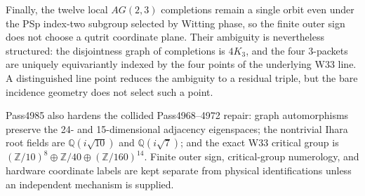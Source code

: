 Finally, the twelve local $AG(2,3)$ completions remain a single orbit even under the PSp index-two subgroup selected by Witting phase, so the finite outer sign does not choose a qutrit coordinate plane.  Their ambiguity is nevertheless structured: the disjointness graph of completions is $4K_3$, and the four 3-packets are uniquely equivariantly indexed by the four points of the underlying W33 line.  A distinguished line point reduces the ambiguity to a residual triple, but the bare incidence geometry does not select such a point.

Pass4985 also hardens the collided Pass4968--4972 repair: graph automorphisms preserve the 24- and 15-dimensional adjacency eigenspaces; the nontrivial Ihara root fields are $\mathbb Q(i\sqrt{10})$ and $\mathbb Q(i\sqrt7)$; and the exact W33 critical group is $(\mathbb Z/10)^8\oplus\mathbb Z/40\oplus(\mathbb Z/160)^{14}$.  Finite outer sign, critical-group numerology, and hardware coordinate labels are kept separate from physical identifications unless an independent mechanism is supplied.
